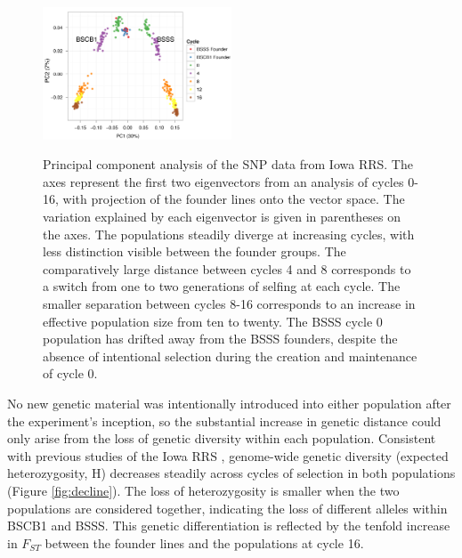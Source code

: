 \documentclass[twocolumn,twoside,letterpaper]{article}
\newcommand{\jri}[1]{\todo[size=\scriptsize, color=flame]{#1}}
\begin{document}
\begin{figure}[tb]   
  \begin{center}
   \vspace{-0mm}
   \includegraphics[width=0.5\textwidth]{fig1}
   \renewcommand{\baselinestretch}{0.9}
   \vspace{-3mm}
   \caption{Principal component analysis of the SNP data from Iowa RRS. The axes represent the first two eigenvectors from an analysis of cycles 0-16, with projection of the founder lines onto the vector space. The variation explained by each eigenvector is given in parentheses on the axes. The populations steadily diverge at increasing cycles, with less distinction visible between the founder groups. The comparatively large distance between cycles 4 and 8 corresponds to a switch from one to two generations of selfing at each cycle. The smaller separation between cycles 8-16 corresponds to an increase in effective population size from ten to twenty. The BSSS cycle 0 population has drifted away from the BSSS founders, despite the absence of intentional selection during the creation and maintenance of cycle 0.
} 
\vspace{-6mm}
    \label{fig:pca}
  \end{center}
\end{figure}

No new genetic material was intentionally introduced into either population after the experiment's inception, so the substantial increase in genetic distance could only arise from the loss of genetic diversity within each population. 
Consistent with previous studies of the Iowa RRS \citep{messmer1991genetic, labate1997molecular,  hagdorn2003molecular, hinze2005population}, genome-wide genetic diversity (expected heterozygosity, H) decreases steadily across cycles of selection in both populations (Figure \ref{fig:decline}). %
The loss of heterozygosity is smaller when the two populations are considered together, indicating the loss of different alleles within BSCB1 and BSSS. 
This genetic differentiation is reflected by the tenfold increase in $F_{ST}$ between the founder lines and the populations at cycle 16. 
\end{document}

